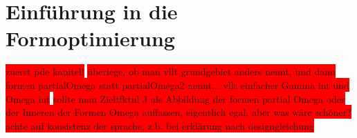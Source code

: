 


\section{Einführung in die Formoptimierung}

\colorbox{red}{zuerst pde kapitel!}
\colorbox{red}{überlege, ob man vllt grundgebiet anders nennt, und dann formen partialOmega statt partialOmega2 nennt... vllt einfacher Gamma int und Omega int}
\colorbox{red}{ sollte man Zieltfktnl J als Abbildung der formen partial Omega oder der Inneren der Formen Omega auffassen, eigentlich egal, aber was wäre schöner? achte auf konsistenz der sprache, z.b. bei erklärung nach designgleichung}

